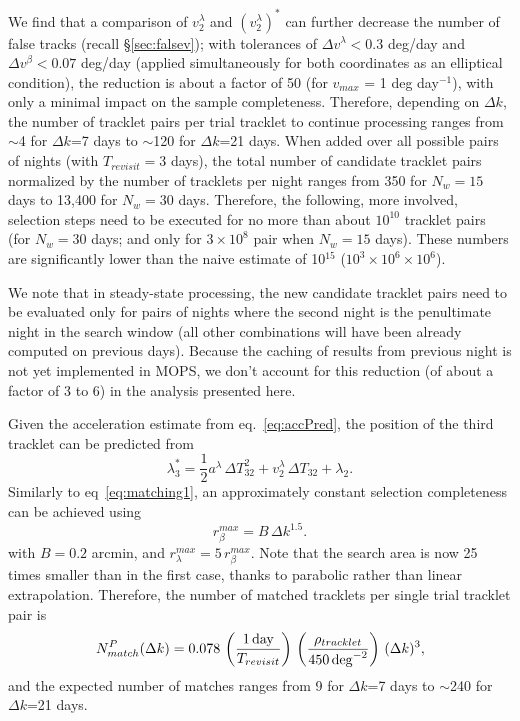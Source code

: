 We find that a comparison of $v_2^\lambda$ and $(v^\lambda_2)^\ast$ can further decrease
the number of false tracks (recall \S\ref{sec:falsev}); with tolerances of $\Delta v^\lambda < 0.3$ deg/day and
$\Delta v^\beta < 0.07$ deg/day (applied simultaneously for both coordinates as an
elliptical condition), the reduction is about a factor of 50 (for $v_{max}$ = 1 deg day$^{-1}$),
with only a minimal impact on the sample completeness. Therefore, depending on $\Delta k$, the number of tracklet
pairs per trial tracklet  to continue processing ranges from $\sim$4 for $\Delta k$=7 days to
$\sim$120 for $\Delta k$=21 days. When added over all possible pairs of nights (with
$T_{revisit}=3$ days), the total number of candidate tracklet pairs normalized by
the number of tracklets per night ranges from 350 for $N_w=15$ days to 13,400 for $N_w=30$ days.
Therefore, the following, more involved, selection steps need to be executed for
no more than about $10^{10}$ tracklet pairs (for $N_w=30$ days; and only for $3\times10^{8}$
pair when $N_w=15$ days). These numbers are significantly lower than the naive estimate of
10$^{15}$ ($10^3\times10^6\times10^6$).

We note that in steady-state processing, the new candidate tracklet pairs need to
be evaluated only for pairs of nights where the second night is the penultimate
night in the search window (all other combinations will have been already computed
on previous days). Because the caching of results from previous night is not
yet implemented in MOPS, we don't account for this reduction (of about a factor of
3 to 6) in the analysis presented here.

Given the acceleration estimate from eq.~\ref{eq:accPred}, the position of the third
tracklet can be predicted from
\begin{equation}
\label{eq:lambdaPred3}
  \lambda_3^\ast = \frac{1}{2} a^\lambda \, \Delta T_{32}^2 + v_2^\lambda \, \Delta T_{32} + \lambda_2.
\end{equation}
Similarly to eq~\ref{eq:matching1}, an approximately constant selection completeness
can be achieved using
\begin{equation}
\label{eq:matching2}
                r_\beta^{max} = B \, \Delta k^{1.5}.
\end{equation}
with $B=0.2$ arcmin, and $r_\lambda^{max} = 5 \, r_\beta^{max}$. Note that the search
area is now 25 times smaller than in the first case, thanks to parabolic rather
than linear extrapolation. Therefore, the number of matched tracklets per single
trial tracklet pair is
\begin{equation}
\label{eq:Nmdk3}
     N^P_{match}(\Delta k) = 0.078 \, \left({1 \, {\rm day} \over T_{revisit}}\right) \,
                    \left( \rho_{tracklet}  \over 450 \, {\rm deg}^{-2} \right) \, (\Delta k)^3,
\end{equation}
and the expected number of matches ranges from 9 for $\Delta k$=7 days to
$\sim$240 for $\Delta k$=21 days.


